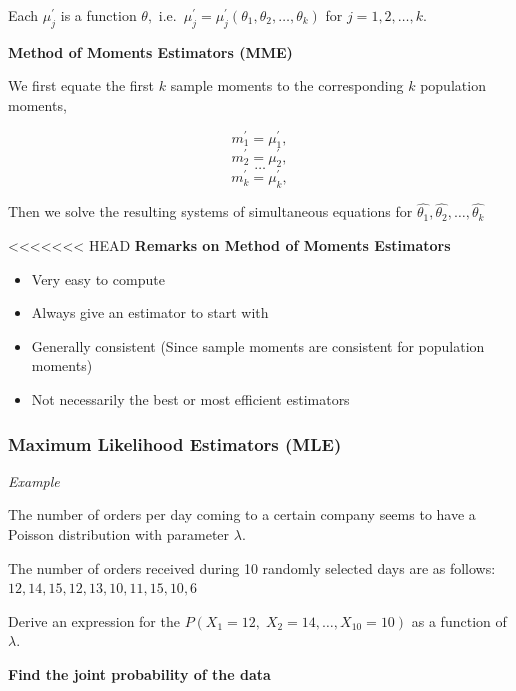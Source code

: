 \documentclass[]{book}
\providecommand{\tightlist}{%
  \setlength{\itemsep}{0pt}\setlength{\parskip}{0pt}}
\begin{document}
Each \(\mu_j^\prime\) is a function \(\theta,\) i.e.~\(\mu_j^\prime= \mu_j^\prime(\theta_1, \theta_2, \dots, \theta_k)\) for \(j=1,2,\dots, k.\)

\textbf{Method of Moments Estimators (MME)}

We first equate the first \(k\) sample moments to the corresponding \(k\) population moments,

\[m_1^\prime = \mu_1^\prime,\]
\[m_2^\prime = \mu_2^\prime,\]
\[\dots\]
\[m_k^\prime = \mu_k^\prime,\]

Then we solve the resulting systems of simultaneous equations for \(\hat{\theta_1}, \hat{\theta_2}, \dots, \hat{\theta_k}\)

<<<<<<< HEAD
\textbf{Remarks on Method of Moments Estimators}

\begin{itemize}
\tightlist
\item
  Very easy to compute
\item
  Always give an estimator to start with
\item
  Generally consistent (Since sample moments are consistent for population moments)
\item
  Not necessarily the best or most efficient estimators
\end{itemize}

\hypertarget{maximum-likelihood-estimators-mle}{%
\subsubsection{Maximum Likelihood Estimators (MLE)}\label{maximum-likelihood-estimators-mle}}

\emph{Example}

The number of orders per day coming to a certain company seems to have a Poisson distribution with parameter \(\lambda\).

The number of orders received during 10 randomly selected days are as follows:
\(12,14,15,12,13,10,11,15,10,6\)

Derive an expression for the \(P(X_1=12, \; X_2 = 14, \dots, X_{10} = 10)\) as a function of \(\lambda.\)

\newpage

\textbf{Find the joint probability of the data}
\end{document}

